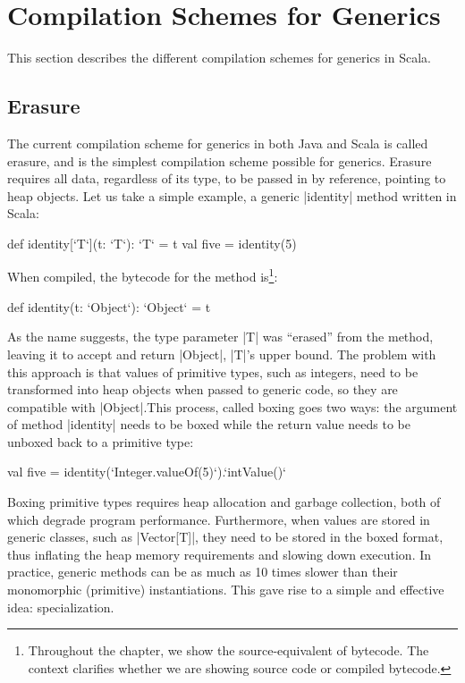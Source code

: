 \section{Compilation Schemes for Generics}
\label{mbox2:sec:minibox}

This section describes the different compilation schemes for generics in Scala.

\subsection{Erasure}

The current compilation scheme for generics in both Java and Scala is called erasure, and is the simplest compilation scheme possible for generics. Erasure requires all data, regardless of its type, to be passed in by reference, pointing to heap objects. Let us take a simple example, a generic |identity| method written in Scala:

\begin{lstlisting-nobreak}
 def identity[`T`](t: `T`): `T` = t
 val five = identity(5)
\end{lstlisting-nobreak}

When compiled, the bytecode for the method is\footnote{Throughout the chapter, we show the source-equivalent of bytecode. The context clarifies whether we are showing source code or compiled bytecode.}:

\begin{lstlisting-nobreak}
 def identity(t: `Object`): `Object` = t
\end{lstlisting-nobreak}

As the name suggests, the type parameter |T| was ``erased'' from the method, leaving it to accept and return |Object|, |T|'s upper bound. The problem with this approach is that values of primitive types, such as integers, need to be transformed into heap objects when passed to generic code, so they are compatible with |Object|.This process, called boxing goes two ways: the argument of method |identity| needs to be boxed while the return value needs to be unboxed back to a primitive type:

\begin{lstlisting-nobreak}
 val five = identity(`Integer.valueOf(5)`).`intValue()`
\end{lstlisting-nobreak}

Boxing primitive types requires heap allocation and garbage collection, both of which degrade program performance. Furthermore, when values are stored in generic classes, such as |Vector[T]|, they need to be stored in the boxed format, thus inflating the heap memory requirements and slowing down execution. In practice, generic methods can be as much as 10 times slower than their monomorphic (primitive) instantiations. This gave rise to a simple and effective idea: specialization.

